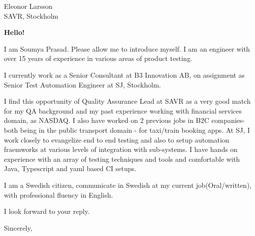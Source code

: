 \documentclass[10pt]{letter} %
\begin{document}

\begin{letter}{Eleonor Larsson \\ SAVR, Stockholm} %


\opening{\textbf{Hello!}}
I am Soumya Prasad. Please allow me to introduce myself.  
I am an engineer with over 15 years of experience in various
areas of product testing.

\hfill \break
I currently work as a Senior Consultant at B3 Innovation AB, on assignment as Senior Test Automation Engineer at SJ, Stockholm.

\hfill \break
I find this opportunity of Quality Assurance Lead at SAVR as a very good match for my QA background and my past experience working with financial services domain, as NASDAQ.
I also have worked on 2 previous jobs in B2C companies- both being in the public transport domain - for taxi/train booking apps.
At SJ, I work closely to evangelize end to end testing and also to setup automation fraemworks at various levels of integration with sub-systems.
I have hands on experience with an array of testing techniques and tools and comfortable with Java, Typescript and yaml based CI setups.

\hfill \break
I am a Swedish citizen, communicate in Swedish at my current job(Oral/written), with professional fluency in English.

\hfill \break
I look forward to your reply.

\vspace{2\parskip} %
\closing{Sincerely,}
\vspace{2\parskip} %




\end{letter}
 
\end{document}
